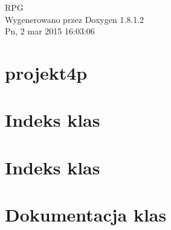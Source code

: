 \documentclass{book}
\begin{document}
\hypersetup{pageanchor=false,citecolor=blue}
\begin{titlepage}
\vspace*{7cm}
\begin{center}
{\Large R\-P\-G }\\
\vspace*{1cm}
{\large Wygenerowano przez Doxygen 1.8.1.2}\\
\vspace*{0.5cm}
{\small Pn, 2 mar 2015 16:03:06}\\
\end{center}
\end{titlepage}
\clearemptydoublepage
{}
\tableofcontents
\clearemptydoublepage
{}
\hypersetup{pageanchor=true,citecolor=blue}
\chapter{projekt4p}
\label{md_README}
\hypertarget{md_README}{}

\chapter{Indeks klas}

\chapter{Indeks klas}

\chapter{Dokumentacja klas}




















\printindex
\end{document}
